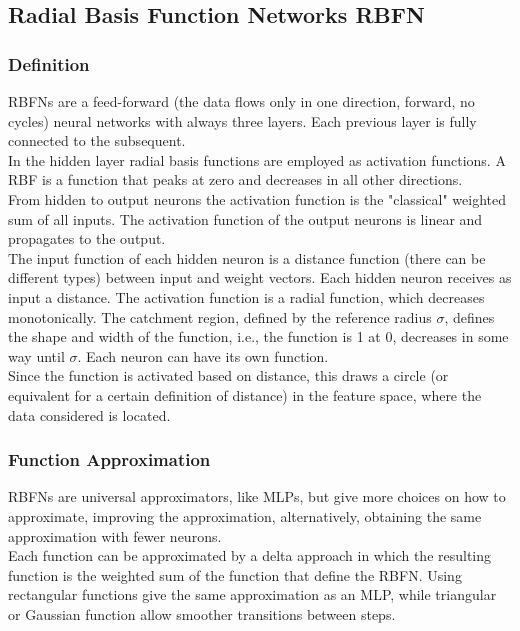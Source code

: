 \subsection{Radial Basis Function Networks RBFN}

\subsubsection{Definition}
RBFNs are a feed-forward (the data flows only in one direction, forward, no cycles) neural networks with always three layers. Each previous layer is fully connected to the subsequent.\\
In the hidden layer radial basis functions are employed as activation functions. A RBF is a function that peaks at zero and decreases in all other directions.\\

From hidden to output neurons the activation function is the "classical" weighted sum of all inputs. The activation function of the output neurons is linear and propagates to the output.\\ 

The input function of each hidden neuron is a distance function (there can be different types) between input and weight vectors. Each hidden neuron receives as input a distance. The activation function is a radial function, which decreases monotonically. The catchment region, defined by the reference radius $\sigma$, defines the shape and width of the function, i.e., the function is 1 at 0, decreases in some way until $\sigma$. Each neuron can have its own function.\\ 
Since the function is activated based on distance, this draws a circle (or equivalent for a certain definition of distance) in the feature space, where the data considered is located.\\

\subsubsection{Function Approximation}
RBFNs are universal approximators, like MLPs, but give more choices on how to approximate, improving the approximation, alternatively, obtaining the same approximation with fewer neurons.\\

Each function can be approximated by a delta approach in which the resulting function is the weighted sum of the function that define the RBFN. Using rectangular functions give the same approximation as an MLP, while triangular or Gaussian function allow smoother transitions between steps.\\


